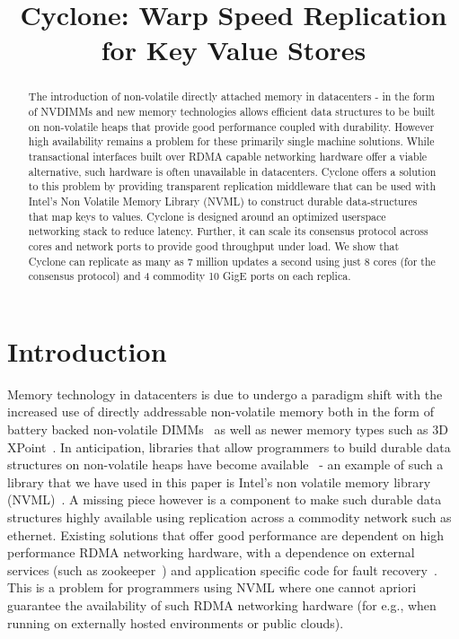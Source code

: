 \documentclass[10pt, preprint]{sigplanconf}
\date{}
\begin{document}
\title{\Large \bf Cyclone: Warp Speed Replication for Key Value Stores}

\maketitle


\begin{abstract}
The introduction of non-volatile directly attached memory in datacenters - in
the form of NVDIMMs and new memory technologies allows efficient data structures
to be built on non-volatile heaps that provide good performance coupled with
durability. However high availability remains a problem for these primarily
single machine solutions. While transactional interfaces built over RDMA capable
networking hardware offer a viable alternative, such hardware is often
unavailable in datacenters. Cyclone offers a solution to this problem by
providing transparent replication middleware that can be used with Intel's Non
Volatile Memory Library (NVML) to construct durable data-structures that map
keys to values.  Cyclone is designed around an optimized userspace networking
stack to reduce latency. Further, it can scale its consensus protocol across
cores and network ports to provide good throughput under load. We show that
Cyclone can replicate as many as 7 million updates a second using just 8 cores
(for the consensus protocol) and 4 commodity 10 GigE ports on each replica.
\end{abstract}

\section{Introduction}
Memory technology in datacenters is due to undergo a paradigm shift with the
increased use of directly addressable non-volatile memory both in the form of
battery backed non-volatile DIMMs~\cite{farm} as well as newer memory types such
as 3D XPoint~\cite{pmfs, bpfs}. In anticipation, libraries that allow
programmers to build durable data structures on non-volatile heaps have become
available~\cite{mnemosyne, nvheaps, cdds} - an example of such a library that we
have used in this paper is Intel's non volatile memory library
(NVML)~\cite{nvml}. A missing piece however is a component to make such durable
data structures highly available using replication across a commodity network
such as ethernet. Existing solutions that offer good performance are dependent
on high performance RDMA networking hardware, with a dependence on external
services (such as zookeeper~\cite{zookeeper}) and application specific code for
fault recovery~\cite{farm, htm}.  This is a problem for programmers using NVML
where one cannot apriori guarantee the availability of such RDMA networking
hardware (for e.g., when running on externally hosted environments or public
clouds).
\end{document}
